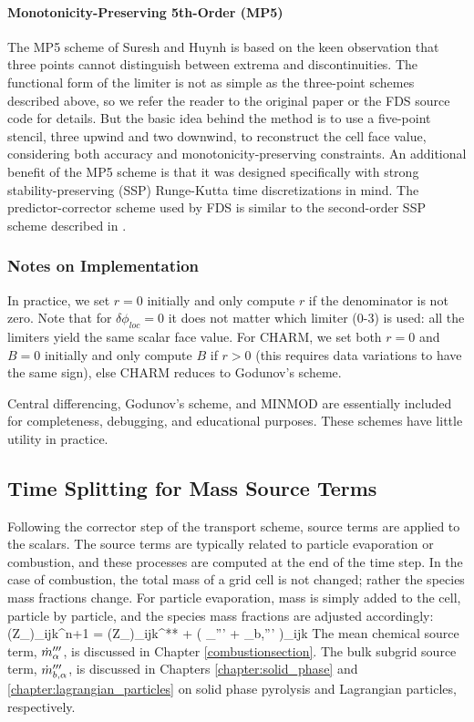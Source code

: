 \paragraph{Monotonicity-Preserving 5th-Order (MP5)}
The MP5 scheme of Suresh and Huynh \cite{Suresh:1997} is based on the keen observation that three points cannot distinguish between extrema and discontinuities.  The functional form of the limiter is not as simple as the three-point schemes described above, so we refer the reader to the original paper or the FDS source code for details.  But the basic idea behind the method is to use a five-point stencil, three upwind and two downwind, to reconstruct the cell face value, considering both accuracy and monotonicity-preserving constraints.  An additional benefit of the MP5 scheme is that it was designed specifically with strong stability-preserving (SSP) Runge-Kutta time discretizations in mind.  The predictor-corrector scheme used by FDS is similar to the second-order SSP scheme described in \cite{Gottlieb:2001}.


\subsubsection{Notes on Implementation}

In practice, we set $r=0$ initially and only compute $r$ if the denominator is not zero.  Note that for $\delta \phi_{loc}=0$ it does not matter which limiter (0-3) is used: all the limiters yield the same scalar face value.  For CHARM, we set both $r=0$ and $B=0$ initially and only compute $B$ if $r>0$ (this requires data variations to have the same sign), else CHARM reduces to Godunov's scheme.

Central differencing, Godunov's scheme, and MINMOD are essentially included for completeness, debugging, and educational purposes.  These schemes have little utility in practice.

\subsection{Time Splitting for Mass Source Terms}
\label{sec_time_splitting}

Following the corrector step of the transport scheme, source terms are applied to the scalars.  The source terms are typically related to particle evaporation or combustion, and these processes are computed at the end of the time step. In the case of combustion, the total mass of a grid cell is not changed; rather the species mass fractions change. For particle evaporation, mass is simply added to the cell, particle by particle, and the species mass fractions are adjusted accordingly:
\be \label{eq:mass_source_terms}
   (\rho Z_\alpha)_{ijk}^{n+1} = (\rho Z_\alpha)_{ijk}^{**} + \dt \left( \dm_{\alpha}''' + \dm_{b,\alpha}''' \right)_{ijk}
\ee
The mean chemical source term, $\dot{m}_{\alpha}'''$, is discussed in Chapter \ref{combustionsection}.  The bulk subgrid source term, $\dot{m}_{b,\alpha}'''$, is discussed in Chapters \ref{chapter:solid_phase} and \ref{chapter:lagrangian_particles} on solid phase pyrolysis and Lagrangian particles, respectively.


